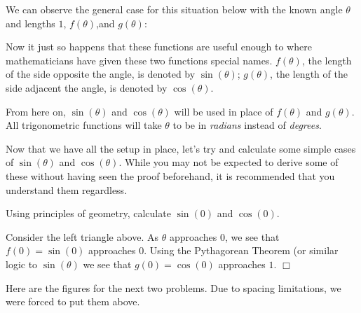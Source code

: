 \documentclass[lang=en,11pt]{elegantbook}
\begin{document}
We can observe the general case for this situation below with the known angle $\theta$ and lengths $1$, $f(\theta)$,and $g(\theta)$: \newpage
\begin{figure}
    \centering
\end{figure}
Now it just so happens that these functions are useful enough to where mathematicians have given these two functions special names. $f(\theta)$, the length of the side opposite the angle, is denoted by $\sin(\theta)$; $g(\theta)$, the length of the side adjacent the angle, is denoted by $\cos(\theta)$.
\begin{note}
From here on, $\sin(\theta)$ and $\cos(\theta)$ will be used in place of $f(\theta)$ and $g(\theta)$.  All trigonometric functions will take $\theta$ to be in \textit{radians} instead of \textit{degrees}.
\end{note}
Now that we have all the setup in place, let’s try and calculate some simple cases of $\sin(\theta)$ and $\cos(\theta)$. While you may not be expected to derive some of these without having seen the proof beforehand, it is recommended that you understand them regardless.
\begin{example}
Using principles of geometry, calculate $\sin(0)$ and $\cos(0)$.
\end{example}
\begin{solution}
Consider the left triangle above.  As $\theta$ approaches $0$, we see that $f(0)=\sin(0)$ approaches $0$. Using the Pythagorean Theorem (or similar logic to $\sin(\theta)$ we see that $g(0)=\cos(0)$ approaches $1$. $\Box$
\end{solution}
Here are the figures for the next two problems.  Due to spacing limitations, we were forced to put them above.
\end{document}
